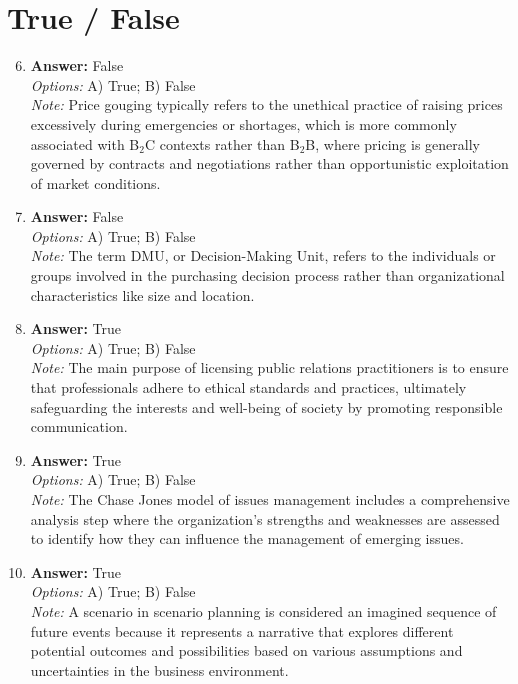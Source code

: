 \documentclass[12pt]{article}
\begin{document}
\section*{True / False}
\begin{enumerate}[label=\arabic*.]
\setcounter{enumi}{5}
\item \textbf{Answer:} False
\\ \textit{Options:} A) True; B) False
\\ \textit{Note:} Price gouging typically refers to the unethical practice of raising prices excessively during emergencies or shortages, which is more commonly associated with B$_{2}$C contexts rather than B$_{2}$B, where pricing is generally governed by contracts and negotiations rather than opportunistic exploitation of market conditions.
\item \textbf{Answer:} False
\\ \textit{Options:} A) True; B) False
\\ \textit{Note:} The term DMU, or Decision-Making Unit, refers to the individuals or groups involved in the purchasing decision process rather than organizational characteristics like size and location.
\item \textbf{Answer:} True
\\ \textit{Options:} A) True; B) False
\\ \textit{Note:} The main purpose of licensing public relations practitioners is to ensure that professionals adhere to ethical standards and practices, ultimately safeguarding the interests and well-being of society by promoting responsible communication.
\item \textbf{Answer:} True
\\ \textit{Options:} A) True; B) False
\\ \textit{Note:} The Chase Jones model of issues management includes a comprehensive analysis step where the organization's strengths and weaknesses are assessed to identify how they can influence the management of emerging issues.
\item \textbf{Answer:} True
\\ \textit{Options:} A) True; B) False
\\ \textit{Note:} A scenario in scenario planning is considered an imagined sequence of future events because it represents a narrative that explores different potential outcomes and possibilities based on various assumptions and uncertainties in the business environment.
\end{enumerate}
\end{document}
